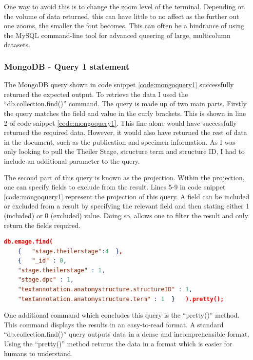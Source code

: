 One way to avoid this is to change the zoom level of the terminal. Depending on the volume of data returned, this can have little to no affect as the further out one zooms, the smaller the font becomes. This can often be a hindrance of using the MySQL command-line tool for advanced queering of large, multicolumn datasets.

\subsubsection*{MongoDB - Query 1 statement}\label{mongoquery1statement}
The MongoDB query shown in code snippet \ref{code:mongoquery1} successfully returned the expected output. To retrieve the data I used the ``db.collection.find()'' command. The query is made up of two main parts. Firstly the query matches the field and value in the curly brackets. This is shown in line 2 of code snippet \ref{code:mongoquery1}. This line alone would have successfully returned the required data. However, it would also have returned the rest of data in the document, such as the publication and specimen information. As I was only looking to pull the Theiler Stage, structure term and structure ID, I had to include an additional parameter to the query.

The second part of this query is known as the projection. Within the projection, one can specify fields to exclude from the result. Lines 5-9 in code snippet \ref{code:mongoquery1} represent the projection of this query. A field can be included or excluded from a result by specifying the relevant field and then stating either 1 (included) or 0 (excluded) value. Doing so, allows one to filter the result and only return the fields required.

\begin{lstlisting}[language=json, caption=MongoDB query 1 statement. All structures at Theiler Stage X., label=code:mongoquery1]
db.emage.find(
	{	"stage.theilerstage":4	},
    {	"_id" : 0,
    "stage.theilerstage" : 1,
    "stage.dpc" : 1,
    "textannotation.anatomystructure.structureID" : 1,
    "textannotation.anatomystructure.term" : 1	}	).pretty();
\end{lstlisting}

One additional command which concludes this query is the ``pretty()'' method. This command displays the results in an easy-to-read format. A standard ``db.collection.find()'' query outputs data in a dense and incomprehensible format. Using the ``pretty()'' method returns the data in a format which is easier for humans to understand.

